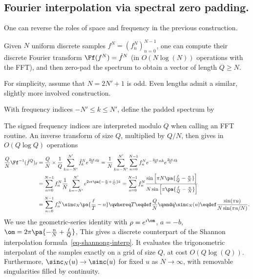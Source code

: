 \subsection{Fourier interpolation via spectral zero padding.}

One can reverse the roles of space and frequency in the previous construction. 
 
Given $N$ uniform discrete samples $f^N=(f^N_n)_{n=0}^{N-1}$, one can compute their discrete Fourier transform $\Ff(f^N) = \hat f^N$ (in $O(N \log(N))$ operations with the FFT),
and then zero-pad the spectrum to obtain a vector of length $Q\geq N$.
 
For simplicity, assume that $N=2N'+1$ is odd. Even lengths admit a similar, slightly more involved construction.
 
With frequency indices $-N'\leq k\leq N'$, define the padded spectrum by

The signed frequency indices are interpreted modulo $Q$ when calling an FFT routine.
An inverse transform of size $Q$, multiplied by $Q/N$, then gives in $O(Q\log Q)$ operations
\begin{align*}
	\frac{Q}{N} \Ff^{-1}( \tilde f^Q )_\ell &= 
	\frac{Q}{N} \times \frac{1}{Q} \sum_{k=-N'}^{N'} \hat f_k^N e^{ \frac{2\imath\pi}{Q} \ell k }
	= \frac{1}{N} \sum_{k=-N'}^{N'} \sum_{n=0}^{N-1} f^N_n e^{-\frac{2\imath\pi}{N} n k} e^{ \frac{2\imath\pi}{Q} \ell k }  \\
	&= \sum_{n=0}^{N-1} f^N_n \frac{1}{N} \sum_{k=-N'}^{N'} e^{ 2\imath\pi \pa{ -\frac{n}{N} + \frac{\ell}{Q} } k } 
	=  \sum_{n=0}^{N-1} f^N_n 
			\frac{ 
				\sin\left[ \pi N \pa{ \frac{\ell}{Q} - \frac{n}{N} } \right]  
			}{
				N \sin\left[ \pi \pa{ \frac{\ell}{Q} - \frac{n}{N} } \right]
			}  \\
	&= \sum_{n=0}^{N-1} f^N_n \sinc_N\pa{ \frac{\ell}{T} - n }
	\qwhereq
	T \eqdef \frac{Q}{N} \qandq \sinc_N(u) \eqdef \frac{ \sin(\pi u) }{ N \sin(\pi u /N) }.
\end{align*}
We use the geometric-series identity with $\rho=e^{\imath \om}$, $a=-b$, $\om = 2\pi \pa{ -\frac{n}{N} + \frac{\ell}{Q} }$,
This gives a discrete counterpart of the Shannon interpolation formula~\eqref{eq-shannong-interp}. It evaluates the trigonometric interpolant of the samples exactly on a grid of size $Q$, at cost $O(Q\log(Q))$. Furthermore, $\sinc_N(u)\to\sinc(u)$ for fixed $u$ as $N\to\infty$, with removable singularities filled by continuity.


